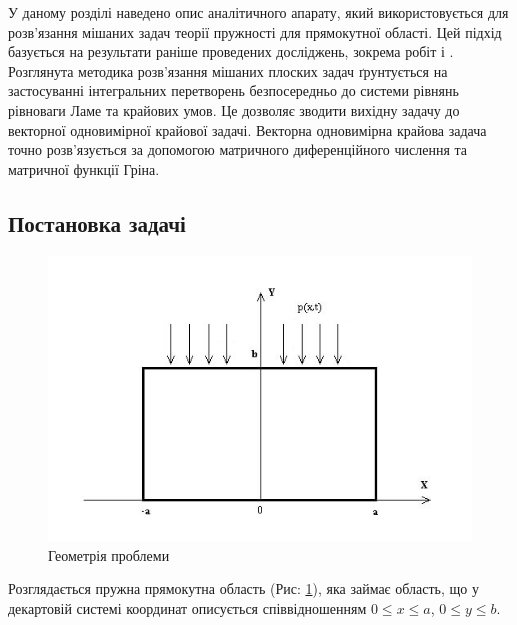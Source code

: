 У даному розділі наведено опис аналітичного апарату, який використовується для розв'язання мішаних задач теорії пружності для прямокутної області.
Цей підхід базується на результати раніше проведених досліджень, зокрема робіт \cite{popov_1} і \cite{popov_2}.
Розглянута методика розв'язання мішаних плоских задач ґрунтується на застосуванні інтегральних перетворень безпосередньо до системи рівнянь рівноваги Ламе та крайових умов.
Це дозволяє зводити вихідну задачу до векторної одновимірної крайової задачі.
Векторна одновимірна крайова задача точно розв'язується за допомогою матричного диференційного числення та матричної функції Гріна.

\subsection{Постановка задачі}
\begin{figure}[h]
    \begin{center}
        \includegraphics[scale=1]{images/geometry/image_2.jpg}
    \end{center}
    \caption{Геометрія проблеми}\label{geom_gen}
\end{figure}
Розглядається пружна прямокутна область (Рис: \ref{geom_gen}), яка займає область, що у декартовій системі координат описується співвідношенням $0 \le x \le a$, $0 \le y \le b$.

